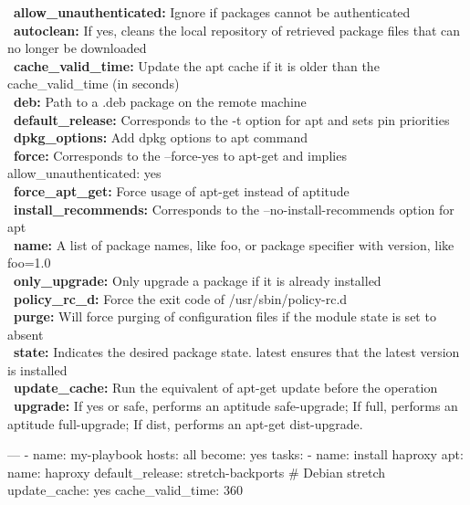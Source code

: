 \documentclass{refcard}
\begin{document}
\textbullet\ \textbf{allow\_unauthenticated:} Ignore if packages cannot be authenticated\\
\textbullet\ \textbf{autoclean:} If yes, cleans the local repository of retrieved package files that can no longer be downloaded\\
\textbullet\ \textbf{cache\_valid\_time:} Update the apt cache if it is older than the cache\_valid\_time (in seconds)\\
\textbullet\ \textbf{deb:} Path to a .deb package on the remote machine\\
\textbullet\ \textbf{default\_release:} Corresponds to the -t option for apt and sets pin priorities\\
\textbullet\ \textbf{dpkg\_options:} Add dpkg options to apt command\\
\textbullet\ \textbf{force:} Corresponds to the --force-yes to apt-get and implies allow\_unauthenticated: yes\\
\textbullet\ \textbf{force\_apt\_get:} Force usage of apt-get instead of aptitude\\
\textbullet\ \textbf{install\_recommends:} Corresponds to the --no-install-recommends option for apt\\
\textbullet\ \textbf{name:} A list of package names, like foo, or package specifier with version, like foo=1.0 \\
\textbullet\ \textbf{only\_upgrade:} Only upgrade a package if it is already installed\\
\textbullet\ \textbf{policy\_rc\_d:} Force the exit code of /usr/sbin/policy-rc.d\\
\textbullet\ \textbf{purge:} Will force purging of configuration files if the module state is set to absent\\
\textbullet\ \textbf{state:} Indicates the desired package state. latest ensures that the latest version is installed\\
\textbullet\ \textbf{update\_cache:} Run the equivalent of apt-get update before the operation\\
\textbullet\ \textbf{upgrade:} If yes or safe, performs an aptitude safe-upgrade; If full, performs an aptitude full-upgrade; If dist, performs an apt-get dist-upgrade.

\begin{yamlbox}[title={playbook using apt module}]
  ---
  - name: my-playbook
    hosts: all
    become: yes
    tasks:
    - name: install haproxy
      apt:
        name: haproxy
        default_release: stretch-backports # Debian stretch
        update_cache: yes
        cache_valid_time: 360
\end{yamlbox}
\end{document}

